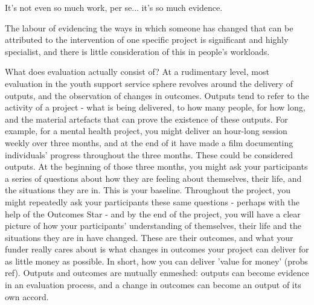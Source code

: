 It's not even so much work, per se... it's so much evidence.

The labour of evidencing the ways in which someone has changed that can be attributed to the intervention of one specific project is significant and highly specialist, and there is little consideration of this in people's workloads.

What does evaluation actually consist of? At a rudimentary level, most evaluation in the youth support service sphere revolves around the delivery of outputs, and the observation of changes in outcomes. Outputs tend to refer to the activity of a project - what is being delivered, to how many people, for how long, and the material artefacts that can prove the existence of these outputs. For example, for a mental health project, you might deliver an hour-long session weekly over three months, and at the end of it have made a film documenting individuals' progress throughout the three months. These could be considered outputs. At the beginning of those three months, you might ask your participants a series of questions about how they are feeling about themselves, their life, and the situations they are in. This is your baseline. Throughout the project, you might repeatedly ask your participants these same questions - perhaps with the help of the Outcomes Star - and by the end of the project, you will have a clear picture of how your participants' understanding of themselves, their life and the situations they are in have changed. These are their outcomes, and what your funder really cares about is what changes in outcomes your project can deliver for as little money as possible. In short, how you can deliver 'value for money' (probs ref). Outputs and outcomes are mutually enmeshed: outputs can become evidence in an evaluation process, and a change in outcomes can become an output of its own accord.

